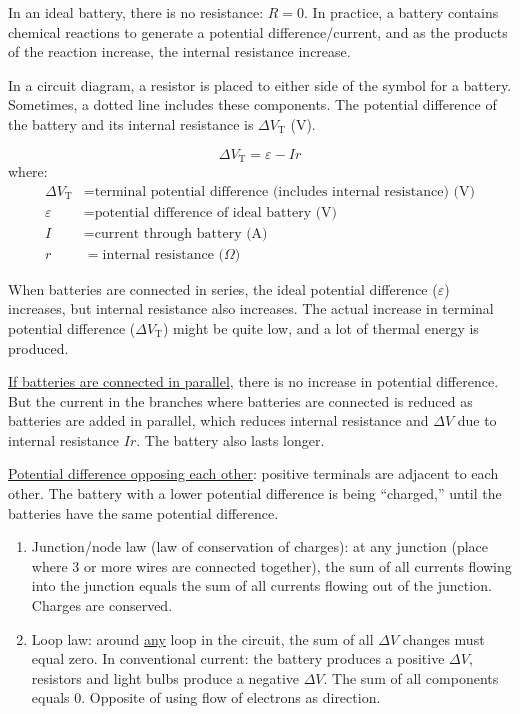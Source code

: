 \documentclass{article}
\newcommand{\theorem}[2]{\begin{tcolorbox}[title={#1},colback=blue!5!white,colframe=blue!75!black,parbox=false] #2 \end{tcolorbox}}
\begin{document}
In an ideal battery, there is no resistance: $R=0$. In practice, a battery contains chemical reactions to generate a potential difference/current, and as the products of the reaction increase, the internal resistance increase.

In a circuit diagram, a resistor is placed to either side of the symbol for a battery. Sometimes, a dotted line includes these components. The potential difference of the battery and its internal resistance is $\Delta V_\text{T}$ (V).
\theorem{Potential difference and internal resistance of battery}{
	\begin{equation*}
		\Delta V_\text{T}=\varepsilon-Ir
	\end{equation*}
	where:
	\begin{align*}
		\Delta V_\text{T}&=\text{terminal potential difference (includes internal resistance) (V)} \\
		\varepsilon&=\text{potential difference of ideal battery (V)} \\
		I&=\text{current through battery (A)} \\
		r&=\text{internal resistance ($\Omega$)}
	\end{align*}
}

When batteries are connected in series, the ideal potential difference ($\varepsilon$) increases, but internal resistance also increases. The actual increase in terminal potential difference ($\Delta V_\text{T}$) might be quite low, and a lot of thermal energy is produced.

\ul{If batteries are connected in parallel}, there is no increase in potential difference. But the current in the branches where batteries are connected is reduced as batteries are added in parallel, which reduces internal resistance and $\Delta V$ due to internal resistance $Ir$. The battery also lasts longer.

\ul{Potential difference opposing each other}: positive terminals are adjacent to each other. The battery with a lower potential difference is being ``charged,'' until the batteries have the same potential difference.

\theorem{Kirchhoff's Laws}{
	\begin{enumerate}
		\item Junction/node law (law of conservation of charges): at any junction (place where 3 or more wires are connected together), the sum of all currents flowing into the junction equals the sum of all currents flowing out of the junction. Charges are conserved.
		\item Loop law: around \ul{any} loop in the circuit, the sum of all $\Delta V$ changes must equal zero. In conventional current: the battery produces a positive $\Delta V$, resistors and light bulbs produce a negative $\Delta V$. The sum of all components equals $0$. Opposite of using flow of electrons as direction.
	\end{enumerate}
}
\end{document}
